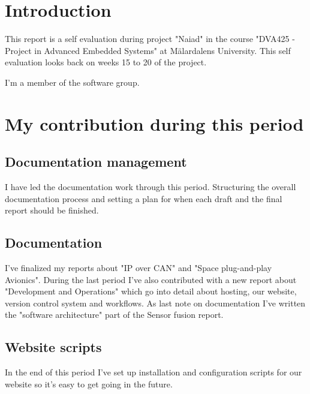 \section{Introduction}
This report is a self evaluation during project "Naiad" in the course
"DVA425 - Project in Advanced Embedded Systems" at M\"{a}lardalens University.
This self evaluation looks back on weeks 15 to 20 of the project.

I'm a member of the software group.

\section{My contribution during this period}

\subsection{Documentation management}
I have led the documentation work through this period. Structuring the
overall documentation process and setting a plan for when each draft and
the final report should be finished.

\subsection{Documentation}
I've finalized my reports about "IP over CAN" and "Space plug-and-play Avionics".
During the last period I've also contributed with a new report about "Development
and Operations" which go into detail about hosting, our website, version
control system and workflows. As last note on documentation I've written
the "software architecture" part of the Sensor fusion report.

\subsection{Website scripts}
In the end of this period I've set up installation and configuration scripts
for our website so it's easy to get going in the future.

